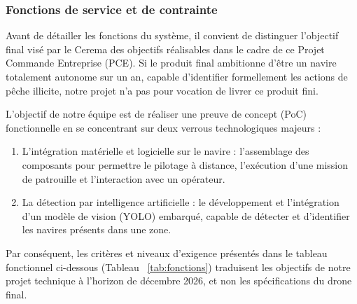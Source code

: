 \subsubsection{Fonctions de service et de contrainte}
Avant de détailler les fonctions du système, il convient de distinguer l'objectif final visé par le Cerema des objectifs réalisables dans le cadre de ce Projet Commande Entreprise (PCE). Si le produit final ambitionne d'être un navire totalement autonome sur un an, capable d'identifier formellement les actions de pêche illicite, notre projet n'a pas pour vocation de livrer ce produit fini.



L'objectif de notre équipe est de réaliser une preuve de concept (PoC) fonctionnelle en se concentrant sur deux verrous technologiques majeurs :

\begin{enumerate}
    \item L'intégration matérielle et logicielle sur le navire : l'assemblage des composants pour permettre le pilotage à distance, l'exécution d'une mission de patrouille et l'interaction avec un opérateur. 
    \item La détection par intelligence artificielle : le développement et l'intégration d'un modèle de vision (YOLO) embarqué, capable de détecter et d'identifier les navires présents dans une zone.
\end{enumerate}

Par conséquent, les critères et niveaux d'exigence présentés dans le tableau fonctionnel ci-dessous (Tableau ~\ref{tab:fonctions}) traduisent les objectifs de notre projet technique à l'horizon de décembre 2026, et non les spécifications du drone final.










